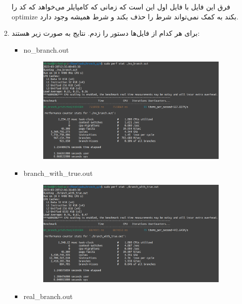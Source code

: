 \begin{enumerate}
\begin{enumerate}
        فرق این فایل با فایل اول این است که زمانی که کامپایلر می‌خواهد که کد را
        optimize
        بکند به کمک 
        نمی‌تواند شرط را حذف بکند و شرط همیشه وجود دارد.
        \item برای هر کدام از فایل‌ها دستور
        را زدم. نتایج به صورت زیر هستند:
        \begin{latin}
        \begin{itemize}
            \item no\_branch.out
            \begin{figure}[H]
                \centerline{\includegraphics[scale=0.35]{pics/5/A/no_branch.png}}
            \end{figure}
            \item branch\_with\_true.out
            \begin{figure}[H]
                \centerline{\includegraphics[scale=0.35]{pics/5/A/branch_with_true.png}}
            \end{figure}
            \item real\_branch.out
            \begin{figure}[H]

\end{figure}
\end{itemize}
\end{latin}
\end{enumerate}
\end{enumerate}
